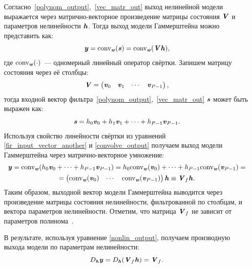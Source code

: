 Согласно~\eqref{polynom_output},~\eqref{vec_matr_out} выход нелинейной модели выражается через матрично-векторное произведение матрицы состояния $\textbf{\textit{V}}$ и параметров нелинейности $\textbf{\textit{h}}$. Тогда выход модели Гаммерштейна можно представить как:
\begin{equation}
	\textbf{\textit{y}}=\text{conv}_{\textbf{\textit{w}}}(\textbf{\textit{s}})=\text{conv}_{\textbf{\textit{w}}}(\textbf{\textit{V}}\textbf{\textit{h}}),
	\label{convolve_output}
\end{equation}
где $\text{conv}_{\textbf{\textit{w}}}(\cdot)$~--- одномерный линейный оператор свёртки. Запишем матрицу состояния через её столбцы:
\begin{equation}
	\textbf{\textit{V}}=\begin{pmatrix}
		\textbf{\textit{v}}_0 & \textbf{\textit{v}}_1 & \cdots & \textbf{\textit{v}}_{P-1}
	\end{pmatrix},
	\label{vand_matrix}
\end{equation}
тогда входной вектор фильтра~\eqref{polynom_output},~\eqref{vec_matr_out} $\textbf{\textit{s}}$ может быть выражен как:
\begin{equation}
	\textbf{\textit{s}}=h_0\textbf{\textit{v}}_0+h_1\textbf{\textit{v}}_1+\cdots+h_{P-1}\textbf{\textit{v}}_{P-1}.
	\label{fir_input_vector_another}
\end{equation}
Используя свойство линейности свёртки из уравнений \eqref{fir_input_vector_another} и \eqref{convolve_output} получаем выход модели Гаммерштейна через матрично-векторное умножение:
\begin{multline}
	\textbf{\textit{y}}=\text{conv}_{\textbf{\textit{w}}}(h_0\textbf{\textit{v}}_0+\cdots+h_{P-1}\textbf{\textit{v}}_{P-1})
	=h_0\text{conv}_{\textbf{\textit{w}}}(\textbf{\textit{v}}_0)+\cdots+h_{P-1}\text{conv}_{\textbf{\textit{w}}}(\textbf{\textit{v}}_{P-1})= \\
	=\begin{pmatrix}
		\text{conv}_{\textbf{\textit{w}}}(\textbf{\textit{v}}_0) & \cdots & \text{conv}_{\textbf{\textit{w}}}(\textbf{\textit{v}}_{P-1})
	\end{pmatrix}\textbf{\textit{h}}\equiv\textbf{\textit{V}}_f\textbf{\textit{h}}.
	\label{nonlin_output}
\end{multline}
Таким образом, выходной вектор модели Гаммерштейна выводится через произведение матрицы состояния нелинейности, фильтрованной по столбцам, и вектора параметров нелинейности. Отметим, что матрица $\textbf{\textit{V}}_f$ не зависит от параметров полинома~.

В результате, используя уравнение \eqref{nonlin_output}, получаем производную выхода модели по параметрам нелинейности:
\begin{equation}
	D_{\textbf{\textit{h}}}\textbf{\textit{y}}=D_{\textbf{\textit{h}}}(\textbf{\textit{V}}_f\textbf{\textit{h}})=\textbf{\textit{V}}_f.
	\label{jacobian_nonlin}
\end{equation}

